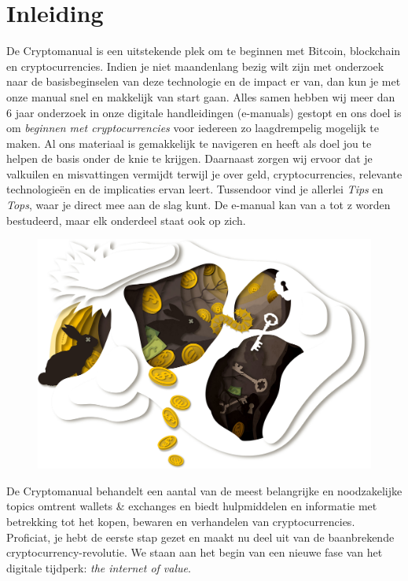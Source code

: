 \chapter*{Inleiding}

De {\selectfont Cryptomanual}    is een uitstekende plek om te beginnen met Bitcoin, blockchain en cryptocurrencies. Indien je niet maandenlang bezig wilt zijn met onderzoek naar de basisbeginselen van deze technologie en de impact er van, dan kun je met onze manual snel en makkelijk van start gaan. Alles samen hebben wij meer dan 6 jaar onderzoek in onze digitale handleidingen (e-manuals) gestopt en ons doel is om \emph{beginnen met cryptocurrencies} voor iedereen zo laagdrempelig mogelijk te maken. \medskip 
\noindent Al ons materiaal is gemakkelijk te navigeren en heeft als doel jou te helpen de basis onder de knie te krijgen. Daarnaast zorgen wij ervoor dat je valkuilen en misvattingen vermijdt terwijl je over geld, cryptocurrencies, relevante technologie{\"e}n en de implicaties ervan leert. Tussendoor vind je allerlei \emph{Tips} en \emph{Tops}, waar je direct mee aan de slag kunt. De e-manual kan van a tot z worden bestudeerd, maar elk onderdeel staat ook op zich. \medskip 

\begin{figure}[ht!]
    \centering
    \includegraphics[width=\textwidth]{illustrations/resized_CRYPTO_KEY_1_PART_1.jpg}
\end{figure}

\medskip

De Cryptomanual behandelt een aantal van de meest belangrijke en noodzakelijke topics omtrent wallets \& exchanges en biedt hulpmiddelen en informatie met betrekking tot het kopen, bewaren en verhandelen van cryptocurrencies. Proficiat, je hebt de eerste stap gezet en maakt nu deel uit van de baanbrekende cryptocurrency-revolutie. We staan aan het begin van een nieuwe fase van het digitale tijdperk: \emph{the internet of value}.\medskip 

